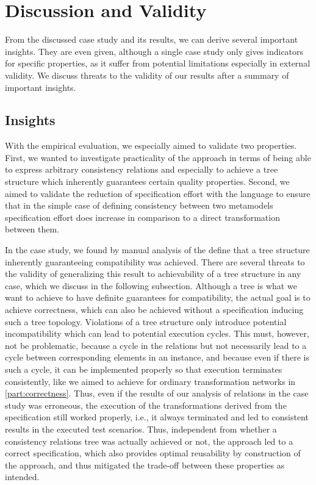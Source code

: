\section{Discussion and Validity}

From the discussed case study and its results, we can derive several important insights.
They are even given, although a single case study only gives indicators for specific properties, as it suffer from potential limitations especially in external validity.
We discuss threats to the validity of our results after a summary of important insights.

\subsection*{Insights}

With the empirical evaluation, we especially aimed to validate two properties.
First, we wanted to investigate practicality of the \commonalities approach in terms of being able to express arbitrary consistency relations and especially to achieve a tree structure which inherently guarantees certain quality properties.
Second, we aimed to validate the reduction of specification effort with the \commonalities language to ensure that in the simple case of defining consistency between two metamodels specification effort does increase in comparison to a direct transformation between them.

In the case study, we found by manual analysis of the define \commonalities that a tree structure inherently guaranteeing compatibility was achieved.
There are several threats to the validity of generalizing this result to achievability of a tree structure in any case, which we discuss in the following subsection.
Although a tree is what we want to achieve to have definite guarantees for compatibility, the actual goal is to achieve correctness, which can also be achieved without a specification inducing such a tree topology.
Violations of a tree structure only introduce potential incompatibility which can lead to potential execution cycles.
This must, however, not be problematic, because a cycle in the relations but not necessarily lead to a cycle between corresponding elements in an instance, and because even if there is such a cycle, it can be implemented properly so that execution terminates consistently, like we aimed to achieve for ordinary transformation networks in \autoref{part:correctness}.
Thus, even if the results of our analysis of relations in the case study was erroneous, the execution of the transformations derived from the \commonalities specification still worked properly, i.e., it always terminated and led to consistent results in the executed test scenarios.
Thus, independent from whether a consistency relations tree was actually achieved or not, the approach led to a correct specification, which also provides optimal reusability by construction of the \commonalities approach, and thus mitigated the trade-off between these properties as intended.

